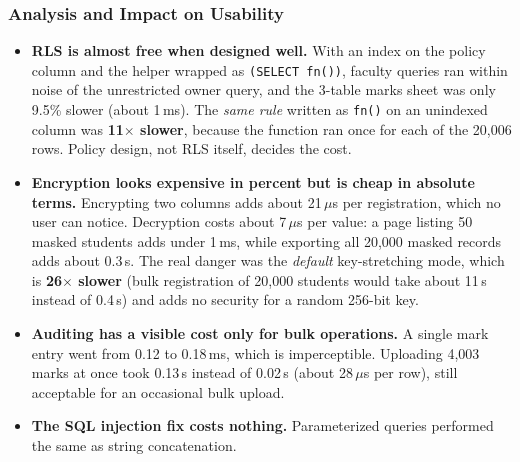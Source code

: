 \documentclass[11pt,a4paper]{report}
\begin{document}
\subsubsection{Analysis and Impact on Usability}
\begin{itemize}
    \item \textbf{RLS is almost free when designed well.} With an index on the policy column and the helper wrapped as \texttt{(SELECT fn())}, faculty queries ran within noise of the unrestricted owner query, and the 3-table marks sheet was only 9.5\% slower (about 1\,ms). The \emph{same rule} written as \texttt{fn()} on an unindexed column was \textbf{11$\times$ slower}, because the function ran once for each of the 20,006 rows. Policy design, not RLS itself, decides the cost.
    \item \textbf{Encryption looks expensive in percent but is cheap in absolute terms.} Encrypting two columns adds about 21\,$\mu$s per registration, which no user can notice. Decryption costs about 7\,$\mu$s per value: a page listing 50 masked students adds under 1\,ms, while exporting all 20,000 masked records adds about 0.3\,s. The real danger was the \emph{default} key-stretching mode, which is \textbf{26$\times$ slower} (bulk registration of 20,000 students would take about 11\,s instead of 0.4\,s) and adds no security for a random 256-bit key.
    \item \textbf{Auditing has a visible cost only for bulk operations.} A single mark entry went from 0.12 to 0.18\,ms, which is imperceptible. Uploading 4,003 marks at once took 0.13\,s instead of 0.02\,s (about 28\,$\mu$s per row), still acceptable for an occasional bulk upload.
    \item \textbf{The SQL injection fix costs nothing.} Parameterized queries performed the same as string concatenation.
\end{itemize}
\end{document}
